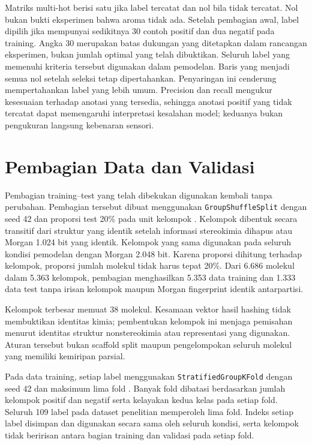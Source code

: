 Matriks multi-hot berisi satu jika label tercatat dan nol bila tidak tercatat. Nol bukan bukti eksperimen bahwa aroma tidak ada. Setelah pembagian awal, label dipilih jika mempunyai sedikitnya 30 contoh positif dan dua negatif pada training. Angka 30 merupakan batas dukungan yang ditetapkan dalam rancangan eksperimen, bukan jumlah optimal yang telah dibuktikan. Seluruh label yang memenuhi kriteria tersebut digunakan dalam pemodelan. Baris yang menjadi semua nol setelah seleksi tetap dipertahankan. Penyaringan ini cenderung mempertahankan label yang lebih umum. Precision dan recall mengukur kesesuaian terhadap anotasi yang tersedia, sehingga anotasi positif yang tidak tercatat dapat memengaruhi interpretasi kesalahan model; keduanya bukan pengukuran langsung kebenaran sensori.

\section{Pembagian Data dan Validasi}
Pembagian training--test yang telah dibekukan digunakan kembali tanpa perubahan. Pembagian tersebut dibuat menggunakan \texttt{GroupShuffleSplit} dengan seed 42 dan proporsi test 20\% pada unit kelompok \cite{sklearngroupshuffle2026}. Kelompok dibentuk secara transitif dari struktur yang identik setelah informasi stereokimia dihapus atau Morgan 1.024 bit yang identik. Kelompok yang sama digunakan pada seluruh kondisi pemodelan dengan Morgan 2.048 bit. Karena proporsi dihitung terhadap kelompok, proporsi jumlah molekul tidak harus tepat 20\%. Dari 6.686 molekul dalam 5.363 kelompok, pembagian menghasilkan 5.353 data training dan 1.333 data test tanpa irisan kelompok maupun Morgan fingerprint identik antarpartisi.

Kelompok terbesar memuat 38 molekul. Kesamaan vektor hasil hashing tidak membuktikan identitas kimia; pembentukan kelompok ini menjaga pemisahan menurut identitas struktur nonstereokimia atau representasi yang digunakan. Aturan tersebut bukan scaffold split maupun pengelompokan seluruh molekul yang memiliki kemiripan parsial.

Pada data training, setiap label menggunakan \texttt{StratifiedGroupKFold} dengan seed 42 dan maksimum lima fold \cite{sklearnstratifiedgroup2026}. Banyak fold dibatasi berdasarkan jumlah kelompok positif dan negatif serta kelayakan kedua kelas pada setiap fold. Seluruh 109 label pada dataset penelitian memperoleh lima fold. Indeks setiap label disimpan dan digunakan secara sama oleh seluruh kondisi, serta kelompok tidak beririsan antara bagian training dan validasi pada setiap fold.

